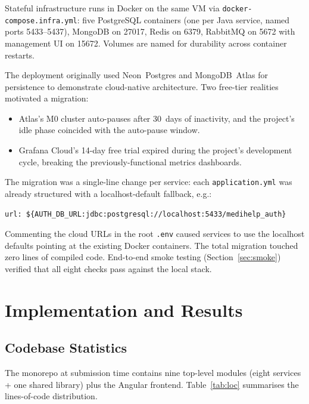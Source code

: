 \documentclass[12pt]{caltech_thesis}
\begin{document}
Stateful infrastructure runs in Docker on the same VM via
\texttt{docker-compose.infra.yml}: five PostgreSQL containers (one per
Java service, named ports 5433--5437), MongoDB on 27017, Redis on 6379,
RabbitMQ on 5672 with management UI on 15672. Volumes are named for
durability across container restarts.

The deployment originally used Neon~Postgres and MongoDB~Atlas for
persistence to demonstrate cloud-native architecture. Two free-tier
realities motivated a migration:
\begin{itemize}
    \item Atlas's M0 cluster auto-pauses after 30~days of inactivity, and
    the project's idle phase coincided with the auto-pause window.
    \item Grafana Cloud's 14-day free trial expired during the project's
    development cycle, breaking the previously-functional metrics
    dashboards.
\end{itemize}

The migration was a single-line change per service: each
\texttt{application.yml} was already structured with a localhost-default
fallback, e.g.:

\begin{lstlisting}
url: ${AUTH_DB_URL:jdbc:postgresql://localhost:5433/medihelp_auth}
\end{lstlisting}

Commenting the cloud URLs in the root \texttt{.env} caused services to
use the localhost defaults pointing at the existing Docker containers.
The total migration touched zero lines of compiled code. End-to-end
smoke testing (Section~\ref{sec:smoke}) verified that all eight checks
pass against the local stack.


\chapter{Implementation and Results}
\label{ch:results}

\section{Codebase Statistics}

The monorepo at submission time contains nine top-level modules
(eight services + one shared library) plus the Angular frontend.
Table~\ref{tab:loc} summarises the lines-of-code distribution.
\end{document}
